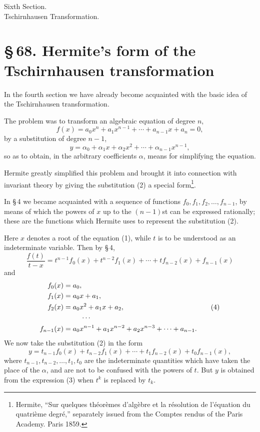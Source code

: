 \documentclass[11pt]{article}
\newcommand{\sect}[2]{\section*{\S\,#1. #2}}
\begin{document}
\begin{center}
{\large Sixth Section.}\\[0.45em]
{\Large Tschirnhausen Transformation.}
\end{center}

\sect{68}{Hermite's form of the Tschirnhausen transformation}

In the fourth section we have already become acquainted with the basic idea of the Tschirnhausen transformation.

The problem was to transform an algebraic equation of degree $n$,
\begin{equation}
 f(x)=a_0x^n+a_1x^{n-1}+\cdots+a_{n-1}x+a_n=0,
\tag{1}
\end{equation}
by a substitution of degree $n-1$,
\begin{equation}
 y=\alpha_0+\alpha_1x+\alpha_2x^2+\cdots+\alpha_{n-1}x^{n-1},
\tag{2}
\end{equation}
so as to obtain, in the arbitrary coefficients $\alpha$, means for simplifying the equation.

Hermite greatly simplified this problem and brought it into connection with invariant theory by giving the substitution (2) a special form\footnote{Hermite, ``Sur quelques théorèmes d'algèbre et la résolution de l'équation du quatrième degré,'' separately issued from the Comptes rendus of the Paris Academy. Paris 1859.}.

In \S\,4 we became acquainted with a sequence of functions $f_0,f_1,f_2,\ldots,f_{n-1}$, by means of which the powers of $x$ up to the $(n-1)$st can be expressed rationally; these are the functions which Hermite uses to represent the substitution (2).

Here $x$ denotes a root of the equation (1), while $t$ is to be understood as an indeterminate variable. Then by \S\,4,
\begin{equation}
 \frac{f(t)}{t-x}=t^{n-1}f_0(x)+t^{n-2}f_1(x)+\cdots+t f_{n-2}(x)+f_{n-1}(x)
\tag{3}
\end{equation}
and
\begin{equation}
\begin{aligned}
 f_0(x)&=a_0,\\
 f_1(x)&=a_0x+a_1,\\
 f_2(x)&=a_0x^2+a_1x+a_2,\\
 &\hspace{2.5em}\cdots\\
 f_{n-1}(x)&=a_0x^{n-1}+a_1x^{n-2}+a_2x^{n-3}+\cdots+a_{n-1}.
\end{aligned}
\tag{4}
\end{equation}
We now take the substitution (2) in the form
\begin{equation}
 y=t_{n-1}f_0(x)+t_{n-2}f_1(x)+\cdots+t_1f_{n-2}(x)+t_0f_{n-1}(x),
\tag{5}
\end{equation}
where $t_{n-1},t_{n-2},\ldots,t_1,t_0$ are the indeterminate quantities which have taken the place of the $\alpha$, and are not to be confused with the powers of $t$. But $y$ is obtained from the expression (3) when $t^k$ is replaced by $t_k$.
\end{document}
